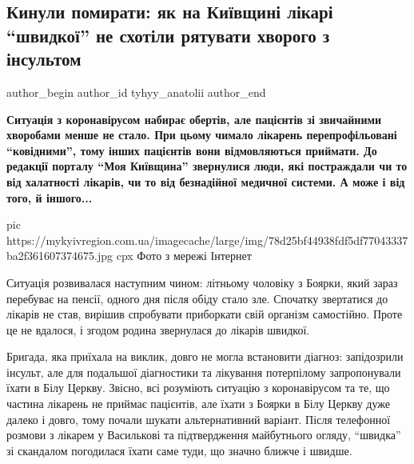  
 
 
 
 
 
\subsection{Кинули помирати: як на Київщині лікарі \enquote{швидкої} не схотіли рятувати хворого з інсультом}
\label{sec:06_12_2020.news.ua.mykyivregion.tyhyy_anatolii.1.kynuly_pomyraty}
\ifcmt
	author_begin
   author_id tyhyy_anatolii
	author_end
\fi


\begin{leftbar}
	\bfseries
Ситуація з коронавірусом набирає обертів, але пацієнтів зі звичайними хворобами
менше не стало. При цьому чимало лікарень перепрофільовані \enquote{ковідними}, тому
інших пацієнтів вони відмовляються приймати. До редакції порталу \enquote{Моя Київщина}
звернулися люди, які постраждали чи то від халатності лікарів, чи то від
безнадійної медичної системи. А може і від того, й іншого...
\end{leftbar}

\ifcmt
pic https://mykyivregion.com.ua/imagecache/large/img/78d25bf44938fdf5df77043337ba2f361607374675.jpg
cpx Фото з мережі Інтернет
\fi

Ситуація розвивалася наступним чином: літньому чоловіку з Боярки, який зараз
перебуває на пенсії, одного дня після обіду стало зле. Спочатку звертатися до
лікарів не став, вирішив спробувати приборкати свій організм самостійно. Проте
це не вдалося, і згодом родина звернулася до лікарів швидкої.

Бригада, яка приїхала на виклик, довго не могла встановити діагноз: запідозрили
інсульт, але для подальшої діагностики та лікування потерпілому запропонували
їхати в Білу Церкву. Звісно, всі розуміють ситуацію з коронавірусом та те, що
частина лікарень не приймає пацієнтів, але їхати з Боярки в Білу Церкву дуже
далеко і довго, тому почали шукати альтернативний варіант. Після телефонної
розмови з лікарем у Василькові та підтвердження майбутнього огляду, \enquote{швидка} зі
скандалом погодилася їхати саме туди, що значно ближче і швидше.

